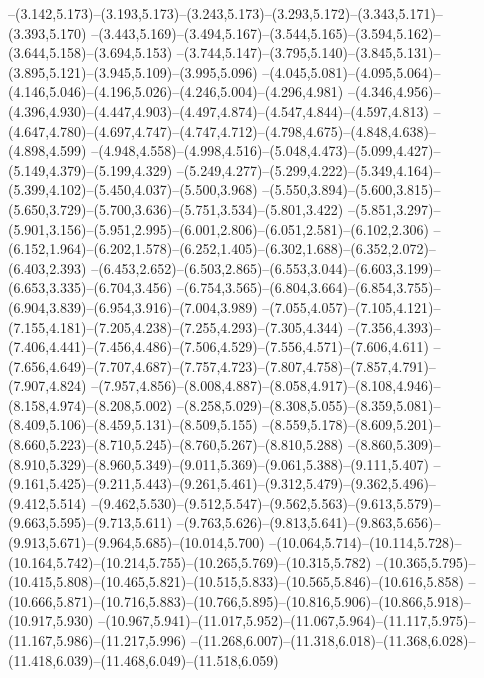   --(3.142,5.173)--(3.193,5.173)--(3.243,5.173)--(3.293,5.172)--(3.343,5.171)--(3.393,5.170)%
  --(3.443,5.169)--(3.494,5.167)--(3.544,5.165)--(3.594,5.162)--(3.644,5.158)--(3.694,5.153)%
  --(3.744,5.147)--(3.795,5.140)--(3.845,5.131)--(3.895,5.121)--(3.945,5.109)--(3.995,5.096)%
  --(4.045,5.081)--(4.095,5.064)--(4.146,5.046)--(4.196,5.026)--(4.246,5.004)--(4.296,4.981)%
  --(4.346,4.956)--(4.396,4.930)--(4.447,4.903)--(4.497,4.874)--(4.547,4.844)--(4.597,4.813)%
  --(4.647,4.780)--(4.697,4.747)--(4.747,4.712)--(4.798,4.675)--(4.848,4.638)--(4.898,4.599)%
  --(4.948,4.558)--(4.998,4.516)--(5.048,4.473)--(5.099,4.427)--(5.149,4.379)--(5.199,4.329)%
  --(5.249,4.277)--(5.299,4.222)--(5.349,4.164)--(5.399,4.102)--(5.450,4.037)--(5.500,3.968)%
  --(5.550,3.894)--(5.600,3.815)--(5.650,3.729)--(5.700,3.636)--(5.751,3.534)--(5.801,3.422)%
  --(5.851,3.297)--(5.901,3.156)--(5.951,2.995)--(6.001,2.806)--(6.051,2.581)--(6.102,2.306)%
  --(6.152,1.964)--(6.202,1.578)--(6.252,1.405)--(6.302,1.688)--(6.352,2.072)--(6.403,2.393)%
  --(6.453,2.652)--(6.503,2.865)--(6.553,3.044)--(6.603,3.199)--(6.653,3.335)--(6.704,3.456)%
  --(6.754,3.565)--(6.804,3.664)--(6.854,3.755)--(6.904,3.839)--(6.954,3.916)--(7.004,3.989)%
  --(7.055,4.057)--(7.105,4.121)--(7.155,4.181)--(7.205,4.238)--(7.255,4.293)--(7.305,4.344)%
  --(7.356,4.393)--(7.406,4.441)--(7.456,4.486)--(7.506,4.529)--(7.556,4.571)--(7.606,4.611)%
  --(7.656,4.649)--(7.707,4.687)--(7.757,4.723)--(7.807,4.758)--(7.857,4.791)--(7.907,4.824)%
  --(7.957,4.856)--(8.008,4.887)--(8.058,4.917)--(8.108,4.946)--(8.158,4.974)--(8.208,5.002)%
  --(8.258,5.029)--(8.308,5.055)--(8.359,5.081)--(8.409,5.106)--(8.459,5.131)--(8.509,5.155)%
  --(8.559,5.178)--(8.609,5.201)--(8.660,5.223)--(8.710,5.245)--(8.760,5.267)--(8.810,5.288)%
  --(8.860,5.309)--(8.910,5.329)--(8.960,5.349)--(9.011,5.369)--(9.061,5.388)--(9.111,5.407)%
  --(9.161,5.425)--(9.211,5.443)--(9.261,5.461)--(9.312,5.479)--(9.362,5.496)--(9.412,5.514)%
  --(9.462,5.530)--(9.512,5.547)--(9.562,5.563)--(9.613,5.579)--(9.663,5.595)--(9.713,5.611)%
  --(9.763,5.626)--(9.813,5.641)--(9.863,5.656)--(9.913,5.671)--(9.964,5.685)--(10.014,5.700)%
  --(10.064,5.714)--(10.114,5.728)--(10.164,5.742)--(10.214,5.755)--(10.265,5.769)--(10.315,5.782)%
  --(10.365,5.795)--(10.415,5.808)--(10.465,5.821)--(10.515,5.833)--(10.565,5.846)--(10.616,5.858)%
  --(10.666,5.871)--(10.716,5.883)--(10.766,5.895)--(10.816,5.906)--(10.866,5.918)--(10.917,5.930)%
  --(10.967,5.941)--(11.017,5.952)--(11.067,5.964)--(11.117,5.975)--(11.167,5.986)--(11.217,5.996)%
  --(11.268,6.007)--(11.318,6.018)--(11.368,6.028)--(11.418,6.039)--(11.468,6.049)--(11.518,6.059)%
